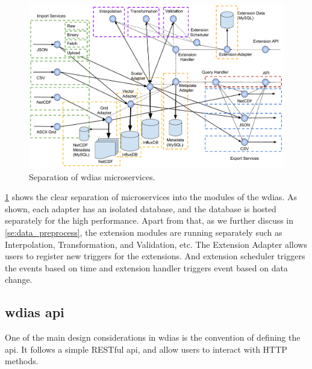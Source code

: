 \begin{figure}[htp]
    \centering
    \includegraphics[width=1\textwidth]{method/microservice/separation_microservices-v4.pdf}
    \caption{Separation of \acrshort{wdias} microservices.}
    \label{fi:wdias_micro_separation}
\end{figure}
\cref{fi:wdias_micro_separation} shows the clear separation of microservices into the modules of the \acrshort{wdias}. As shown, each adapter has an isolated database, and the database is hosted separately for the high performance. 
Apart from that, as we further discuss in \cref{se:data_preprocess}, the extension modules are running separately such as Interpolation, Transformation, and Validation, etc. 
The Extension Adapter allows users to register new triggers for the extensions. And extension scheduler triggers the events based on time and extension handler triggers event based on data change.


\subsection{\acrshort{wdias} \acrfull{api}}
\label{sebse:wdias_api}
One of the main design considerations in \acrshort{wdias} is the convention of defining the \acrshort{api}. It follows a simple RESTful \acrshort{api}, and allow users to interact with HTTP methods.

